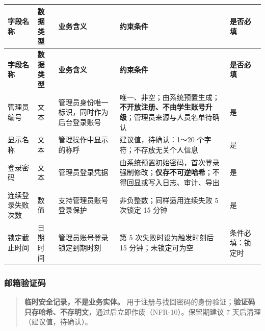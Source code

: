 \documentclass[12pt,a4paper]{ctexart}
\begin{document}
{\footnotesize
\begin{longtable}{|p{2.00cm}|p{1.52cm}|p{3.87cm}|p{6.61cm}|p{2.00cm}|}
\hline
\textbf{字段名称} & \textbf{数据类型} & \textbf{业务含义} & \textbf{约束条件} & \textbf{是否必填} \\
\hline
\endfirsthead
\hline
\textbf{字段名称} & \textbf{数据类型} & \textbf{业务含义} & \textbf{约束条件} & \textbf{是否必填} \\
\hline
\endhead
\hline
\endfoot
管理员编号 & 文本 & 管理员身份唯一标识，同时作为后台登录账号 & 唯一、非空；由系统预置生成；\textbf{不开放注册、不由学生账号升级}；管理员来源与人员名单待确认 & 是 \\
\hline
显示名称 & 文本 & 管理操作中显示的称呼 & 建议值，待确认：1～20 个字符；不存放无关个人信息 & 是 \\
\hline
登录密码 & 文本 & 管理员登录凭据 & 由系统预置初始密码，首次登录强制修改；\textbf{仅存不可逆哈希}；不得回显或写入日志、审计、导出 & 是 \\
\hline
连续登录失败次数 & 数值 & 支持管理员账号登录保护 & 非负整数；同样适用连续失败 5 次锁定 15 分钟 & 是 \\
\hline
锁定截止时间 & 日期时间 & 管理员账号登录锁定到期时刻 & 第 5 次失败时设为触发时刻后 15 分钟；未锁定可为空 & 条件必填：锁定时 \\
\hline
\end{longtable}
}


\subsubsection*{邮箱验证码}

\begin{quote}\small
\textbf{临时安全记录，不是业务实体。} 用于注册与找回密码的身份验证；\textbf{验证码只存哈希、不存明文}，通过后立即作废（NFR-10）。保留期建议 7 天后清理（建议值，待确认）。

\end{quote}
\end{document}
